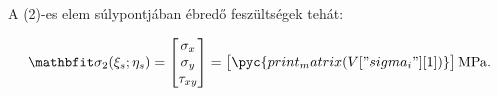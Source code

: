 A (2)-es elem súlypontjában ébredő feszültségek tehát:
\begin{myframe}
  \begin{equation}
    \rvec \sigma_2(\xi_s; \eta_s)
    =
    \begin{bmatrix}
      \sigma_x \\ \sigma_y \\ \tau_{xy}
    \end{bmatrix}
    =
    \siplaces{4}
    \begin{bmatrix}
      \pyc{print_matrix(V["sigma_i"][1])}
    \end{bmatrix}
    \mathrm{MPa}
    \text.
  \end{equation}
\end{myframe}
